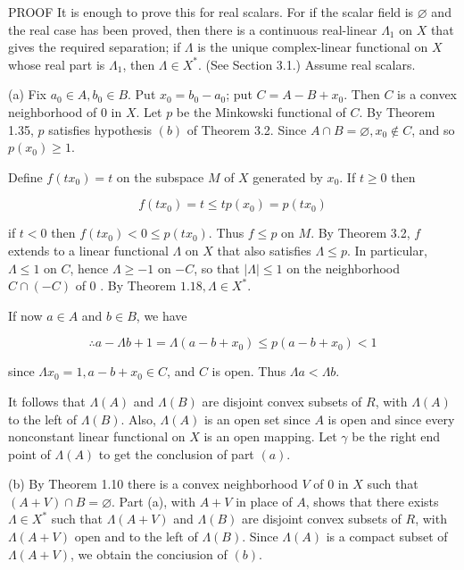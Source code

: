 \documentclass[10pt]{article}
\begin{document}
PROOF It is enough to prove this for real scalars. For if the scalar field is $\varnothing$ and the real case has been proved, then there is a continuous real-linear $\Lambda_{1}$ on $X$ that gives the required separation; if $\Lambda$ is the unique complex-linear functional on $X$ whose real part is $\Lambda_{1}$, then $\Lambda \in X^{*}$. (See Section 3.1.) Assume real scalars.

(a) Fix $a_{0} \in A, b_{0} \in B$. Put $x_{0}=b_{0}-a_{0}$; put $C=A-B+x_{0}$. Then $C$ is a convex neighborhood of 0 in $X$. Let $p$ be the Minkowski functional of $C$. By Theorem 1.35, $p$ satisfies hypothesis $(b)$ of Theorem 3.2. Since $A \cap B=\varnothing, x_{0} \notin C$, and so $p\left(x_{0}\right) \geq 1$.

Define $f\left(t x_{0}\right)=t$ on the subspace $M$ of $X$ generated by $x_{0}$. If $t \geq 0$ then

$$
f\left(t x_{0}\right)=t \leq t p\left(x_{0}\right)=p\left(t x_{0}\right)
$$

if $t<0$ then $f\left(t x_{0}\right)<0 \leq p\left(t x_{0}\right)$. Thus $f \leq p$ on $M$. By Theorem 3.2, $f$ extends to a linear functional $\Lambda$ on $X$ that also satisfies $\Lambda \leq p$. In particular, $\Lambda \leq 1$ on $C$, hence $\Lambda \geq-1$ on $-C$, so that $|\Lambda| \leq 1$ on the neighborhood $C \cap(-C)$ of 0 .
By Theorem $1.18, \Lambda \in X^{*}$.

If now $a \in A$ and $b \in B$, we have

$$
\therefore a-\Lambda b+1=\Lambda\left(a-b+x_{0}\right) \leq p\left(a-b+x_{0}\right)<1
$$

since $\Lambda x_{0}=1, a-b+x_{0} \in C$, and $C$ is open. Thus $\Lambda a<\Lambda b$.

It follows that $\Lambda(A)$ and $\Lambda(B)$ are disjoint convex subsets of $R$, with $\Lambda(A)$ to the left of $\Lambda(B)$. Also, $\Lambda(A)$ is an open set since $A$ is open and since every nonconstant linear functional on $X$ is an open mapping. Let $\gamma$ be the right end point of $\Lambda(A)$ to get the conclusion of part $(a)$.

(b) By Theorem 1.10 there is a convex neighborhood $V$ of 0 in $X$ such that $(A+V) \cap B=\varnothing$. Part (a), with $A+V$ in place of $A$, shows that there exists $\Lambda \in X^{*}$ such that $\Lambda(A+V)$ and $\Lambda(B)$ are disjoint convex subsets of $R$, with $\Lambda(A+V)$ open and to the left of $\Lambda(B)$. Since $\Lambda(A)$ is a compact subset of $\Lambda(A+V)$, we obtain the conciusion of $(b)$.
\end{document}
